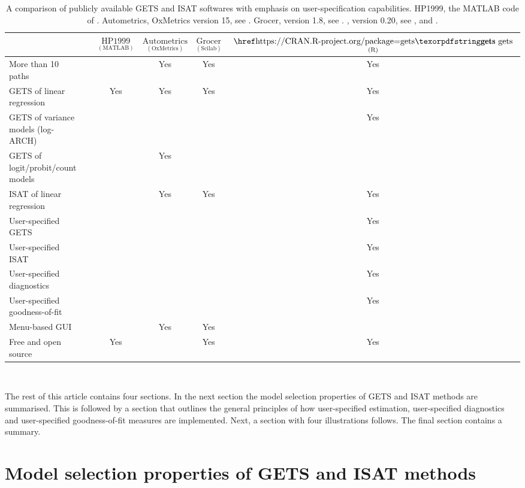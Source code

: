 \begin{table}[t!]
	\centering
	\setlength{\tabcolsep}{3pt} %
	\begin{tabular}{lccccc}
		\hline
		& & $\underset{(\text{MATLAB})}{\text{HP1999}}$ &  $\underset{(\text{OxMetrics})}{\text{Autometrics}}$ & $\underset{(\text{Scilab})}{\text{Grocer}}$ & $\underset{(\text{R})}{ \text{ \CRANpkg{gets} } }$ \\
		\hline
		More than 10 paths & & & Yes & Yes & Yes \\[1mm] 
		GETS of linear regression & & Yes & Yes & Yes & Yes \\[1mm]
		GETS of variance models (log-ARCH) & & & & & Yes \\[1mm]
		GETS of logit/probit/count models & & & Yes & & \\[1mm]
		ISAT of linear regression & & & Yes & Yes & Yes \\[1mm]
		User-specified GETS & &  &  &  & Yes \\[1mm]
		User-specified ISAT &  &  &  & & Yes \\[1mm]
		User-specified diagnostics &  & & & & Yes \\[1mm]
		User-specified goodness-of-fit & & &  & & Yes \\[1mm]
		Menu-based GUI &  & & Yes & Yes & \\[1mm]		
		Free and open source & & Yes & & Yes & Yes \\[1mm]
		\hline
	\end{tabular}\\
	\caption{\label{table:software:comparison} A comparison of publicly available GETS and ISAT softwares with emphasis on user-specification capabilities. HP1999, the MATLAB code of \citet{Hooveretal99}. Autometrics, OxMetrics version 15, see \citet{DoornikHendry2018}. Grocer, version 1.8, see \citet{DuboisMichaux2016}. , version 0.20, see \citet{PretisReadeSucarrat2019getsV020}, and \citet{PretisReadeSucarrat2018}.}
\end{table}

The rest of this article contains four sections. In the next section the model selection properties of GETS and ISAT methods are summarised. This is followed by a section that outlines the general principles of how user-specified estimation, user-specified diagnostics and user-specified goodness-of-fit measures are implemented. Next, a section with four illustrations follows. The final section contains a summary.

\section{Model selection properties of GETS and ISAT methods} 

